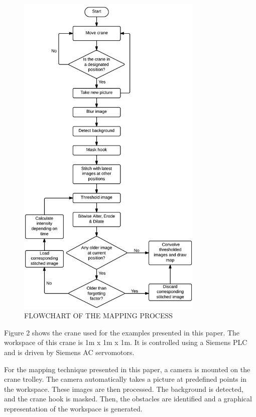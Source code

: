 \documentclass[twocolumn,10pt]{asme2e}
\begin{document}
\begin{figure}[htbp]
\begin{center}
\includegraphics[width=3.5in]{crane_flowchart}
\caption{FLOWCHART OF THE MAPPING PROCESS}
\label{default}
\end{center}
\end{figure}

Figure 2 shows the crane used for the examples presented in this paper. The workspace of this crane is 1m x 1m x 1m. It is controlled using a Siemens PLC and is driven by Siemens AC servomotors.

For the mapping technique presented in this paper, a camera is mounted on the crane trolley. The camera automatically takes a picture at predefined points in the workspace. These images are then processed. The background is detected, and the crane hook is masked. Then, the obstacles are identified and a graphical representation of the workspace is generated. 

\end{document}
